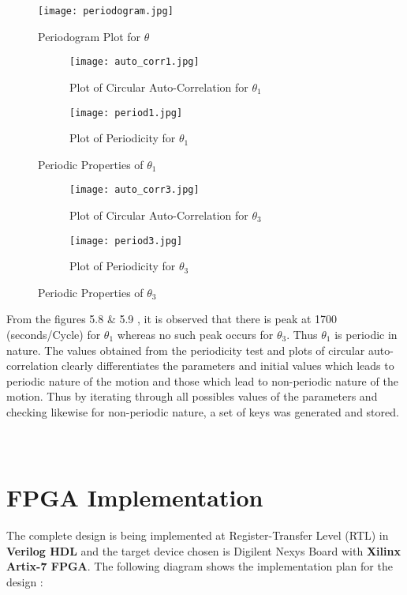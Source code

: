 \begin{figure}[H]
\centering
\texttt{[image: periodogram.jpg]}
\caption{Periodogram Plot for ${\theta}$}\label{fig:periodogram}
\end{figure}


\begin{figure}[H]
\begin{subfigure}{0.5\textwidth}
\texttt{[image: auto\_corr1.jpg]}
\caption{Plot of Circular Auto-Correlation for ${\theta_{1}}$}\label{fig:cir_auto1}
\end{subfigure}
\begin{subfigure}{0.5\textwidth}
\texttt{[image: period1.jpg]}
\caption{Plot of Periodicity for ${\theta_{1}}$}\label{fig:period1}
\end{subfigure}
\caption{Periodic Properties of ${\theta_{1}}$}\label{fig:image4}
\end{figure}

\begin{figure}[H]
\begin{subfigure}{0.5\textwidth}
\texttt{[image: auto\_corr3.jpg]}
\caption{Plot of Circular Auto-Correlation for ${\theta_{3}}$}\label{fig:cir_auto3}
\end{subfigure}
\begin{subfigure}{0.5\textwidth}
\texttt{[image: period3.jpg]}
\caption{Plot of Periodicity for ${\theta_{3}}$}\label{fig:period3}
\end{subfigure}
\caption{Periodic Properties of ${\theta_{3}}$}\label{fig:image5}
\end{figure}

From the figures 5.8 \& 5.9 , it is observed that there is peak at 1700 (seconds/Cycle) for $\theta_{1}$ whereas no such peak occurs for $\theta_{3}$. Thus $\theta_{1}$ is periodic in nature. The values obtained from the periodicity test and plots of circular auto-correlation clearly differentiates the parameters and initial values which leads to periodic nature of the motion and those which lead to non-periodic nature of the motion. Thus by iterating through all possibles values of the parameters and checking likewise for non-periodic nature, a set of keys was generated and stored. 
\\\\\\

\section{FPGA Implementation}
The complete design is being implemented at Register-Transfer Level (RTL) in {\bf Verilog HDL} and the target device chosen is Digilent Nexys Board with {\bf Xilinx Artix-7 FPGA}. The following diagram shows the implementation plan for the design :

